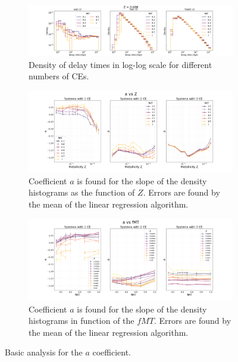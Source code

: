 \documentclass[preprint,12pt]{elsarticle}
\begin{document}
\begin{figure}[htp]
    \begin{subfigure}[t]{1\textwidth}
      \centering
      \includegraphics[width=1\textwidth]{Images/delaytimes_Z0.008_CEcount.png}
      \caption{Density of delay times in log-log scale for different numbers of CEs.}
      \label{img:delaytimes_count_CE}
    \end{subfigure}
    \begin{subfigure}[t]{1\textwidth}
      \centering
      \includegraphics[width=1\textwidth]{Images/a_vs_Z_CE_count.png}
      \caption{Coefficient $a$ is found for the slope of the density histograms as the  function of $Z$. Errors are found by the mean of the linear regression algorithm.}
      \label{img:a_vs_Z_CE_count}
    \end{subfigure}
    \hfill
    \begin{subfigure}[t]{1\textwidth}
      \centering
      \includegraphics[width=1\textwidth]{Images/a_vs_fMT_CE_count.png}
      \caption{Coefficient $a$ is found for the slope of the density histograms in function of the $fMT$. Errors are found by the mean of the linear regression algorithm.}
      \label{img:a_vs_fMT_CE_count}
    \end{subfigure}
    \caption{Basic analysis for the $a$ coefficient.}
  \end{figure}
\end{document}

